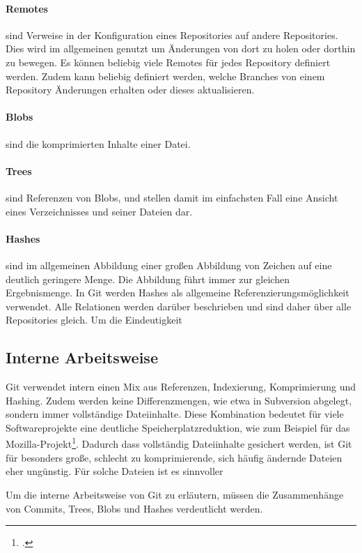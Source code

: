\paragraph{Remotes} sind Verweise in der Konfiguration eines Repositories auf andere Repositories. Dies wird im allgemeinen genutzt um Änderungen von dort zu holen oder dorthin zu bewegen. Es können beliebig viele Remotes für jedes Repository definiert werden. Zudem kann beliebig definiert werden, welche Branches von einem Repository Änderungen erhalten oder dieses aktualisieren.

\paragraph{Blobs} sind die komprimierten Inhalte einer Datei.

\paragraph{Trees} sind Referenzen von Blobs, und stellen damit im einfachsten Fall eine Ansicht eines Verzeichnisses und seiner Dateien dar.

\paragraph{Hashes} sind im allgemeinen Abbildung einer großen Abbildung von Zeichen auf eine deutlich geringere Menge. Die Abbildung führt immer zur gleichen Ergebnismenge. In Git werden Hashes als allgemeine Referenzierungsmöglichkeit verwendet. Alle Relationen werden darüber beschrieben und sind daher über alle Repositories gleich. Um die Eindeutigkeit 

\subsection{Interne Arbeitsweise}

Git verwendet intern einen Mix aus Referenzen, Indexierung, Komprimierung und Hashing. Zudem werden keine Differenzmengen, wie etwa in Subversion abgelegt, sondern immer vollständige Dateiinhalte. Diese Kombination bedeutet für viele Softwareprojekte eine deutliche Speicherplatzreduktion, wie zum Beispiel für das Mozilla-Projekt\footcite{kernel-git-svn}. Dadurch dass vollständig Dateiinhalte gesichert werden, ist Git für besonders große, schlecht zu komprimierende, sich häufig ändernde Dateien eher ungünstig. Für solche Dateien ist es sinnvoller 

Um die interne Arbeitsweise von Git zu erläutern, müssen die Zusammenhänge von Commits, Trees, Blobs und Hashes verdeutlicht werden.

